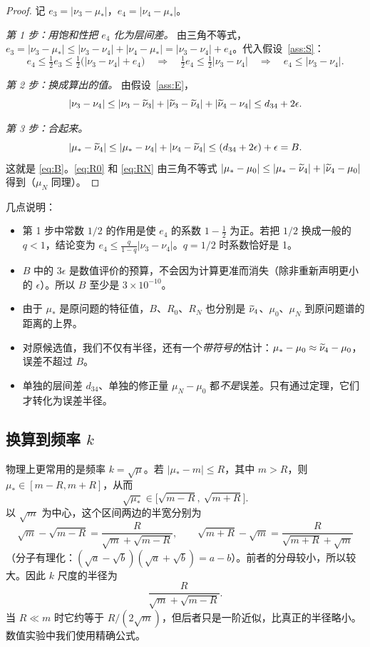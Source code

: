 \documentclass[11pt,a4paper,fontset=fandol]{ctexart}
\begin{document}
\begin{proof}
记 $e_3=|\nu_3-\mu_*|$，$e_4=|\nu_4-\mu_*|$。

\emph{第 1 步：用饱和性把 $e_4$ 化为层间差。} 由三角不等式，$e_3=|\nu_3-\mu_*|\le|\nu_3-\nu_4|+|\nu_4-\mu_*|=|\nu_3-\nu_4|+e_4$。代入假设~\ref{ass:S}：
\[
e_4\le\tfrac12e_3\le\tfrac12\bigl(|\nu_3-\nu_4|+e_4\bigr)
\quad\Longrightarrow\quad
\tfrac12e_4\le\tfrac12|\nu_3-\nu_4|
\quad\Longrightarrow\quad
e_4\le|\nu_3-\nu_4| .
\]

\emph{第 2 步：换成算出的值。} 由假设~\ref{ass:E}，
\[
|\nu_3-\nu_4|\le|\nu_3-\widetilde\nu_3|+|\widetilde\nu_3-\widetilde\nu_4|+|\widetilde\nu_4-\nu_4|\le d_{34}+2\epsilon .
\]

\emph{第 3 步：合起来。}
\[
|\mu_*-\widetilde\nu_4|\le|\mu_*-\nu_4|+|\nu_4-\widetilde\nu_4|\le(d_{34}+2\epsilon)+\epsilon=B .
\]
这就是 \eqref{eq:B}。\eqref{eq:R0} 和 \eqref{eq:RN} 由三角不等式 $|\mu_*-\mu_0|\le|\mu_*-\widetilde\nu_4|+|\widetilde\nu_4-\mu_0|$ 得到（$\mu_N$ 同理）。
\end{proof}

几点说明：
\begin{itemize}
\item 第 1 步中常数 $1/2$ 的作用是使 $e_4$ 的系数 $1-\frac12$ 为正。若把 $1/2$ 换成一般的 $q<1$，结论变为 $e_4\le\frac q{1-q}|\nu_3-\nu_4|$。$q=1/2$ 时系数恰好是 1。
\item $B$ 中的 $3\epsilon$ 是数值评价的预算，不会因为计算更准而消失（除非重新声明更小的 $\epsilon$）。所以 $B$ 至少是 $3\times10^{-10}$。
\item 由于 $\mu_*$ 是原问题的特征值，$B$、$R_0$、$R_N$ 也分别是 $\widetilde\nu_4$、$\mu_0$、$\mu_N$ 到原问题谱的距离的上界。
\item 对原候选值，我们不仅有半径，还有一个\emph{带符号的}估计：$\mu_*-\mu_0\approx\widetilde\nu_4-\mu_0$，误差不超过 $B$。
\item 单独的层间差 $d_{34}$、单独的修正量 $\mu_N-\mu_0$ 都\emph{不是}误差。只有通过定理，它们才转化为误差半径。
\end{itemize}

\subsection{\texorpdfstring{换算到频率 $k$}{换算到频率 k}}

物理上更常用的是频率 $k=\sqrt\mu$。若 $|\mu_*-m|\le R$，其中 $m>R$，则 $\mu_*\in[m-R,m+R]$，从而
\[
\sqrt{\mu_*}\in\bigl[\sqrt{m-R},\ \sqrt{m+R}\bigr] .
\]
以 $\sqrt m$ 为中心，这个区间两边的半宽分别为
\[
\sqrt m-\sqrt{m-R}=\frac{R}{\sqrt m+\sqrt{m-R}},\qquad
\sqrt{m+R}-\sqrt m=\frac{R}{\sqrt{m+R}+\sqrt m}
\]
（分子有理化：$(\sqrt a-\sqrt b)(\sqrt a+\sqrt b)=a-b$）。前者的分母较小，所以较大。因此 $k$ 尺度的半径为
\[
\frac{R}{\sqrt m+\sqrt{m-R}} .
\]
当 $R\ll m$ 时它约等于 $R/(2\sqrt m)$，但后者只是一阶近似，比真正的半径略小。数值实验中我们使用精确公式。
\end{document}
